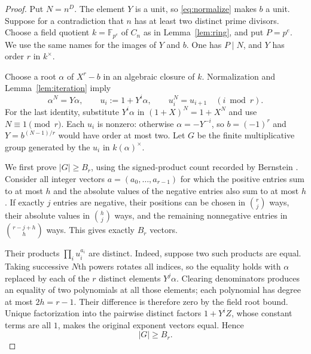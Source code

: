 \documentclass[11pt]{article}
\theoremstyle{definition}
\theoremstyle{remark}
\newcommand{\F}{\mathbb F}
\begin{document}
\begin{proof}
Put $N=n^D$. The element $Y$ is a unit, so
\eqref{eq:normalize} makes $b$ a unit. Suppose for a contradiction
that $n$ has at least two distinct prime divisors. Choose a field
quotient $k=\F_{p^e}$ of $C_n$ as in Lemma~\ref{lem:ring}, and
put $P=p^e$. We use the same names for the images of $Y$ and $b$.
One has $P\mid N$, and $Y$ has order $r$ in $k^\times$.

Choose a root $\alpha$ of $X^r-b$ in an algebraic closure of $k$.
Normalization and Lemma~\ref{lem:iteration} imply
\[
 \alpha^N=Y\alpha,\qquad
 u_i:=1+Y^i\alpha,\qquad u_i^N=u_{i+1}\quad(i\bmod r).
\]
For the last identity, substitute $Y^i\alpha$ in
$(1+X)^N=1+X^N$ and use $N\equiv1\pmod r$.
Each $u_i$ is nonzero: otherwise $\alpha=-Y^{-i}$, so
$b=(-1)^r$ and $Y=b^{(N-1)/r}$ would have order at most two.
Let $G$ be the finite multiplicative group generated by the $u_i$
in $k(\alpha)^\times$.

We first prove $|G|\ge B_r$, using the signed-product count recorded
by Bernstein \cite[Section 3]{bernstein}. Consider all integer vectors
$a=(a_0,\ldots,a_{r-1})$ for which the positive entries sum to at
most $h$ and the absolute values of the negative entries also sum
to at most $h$. If exactly $j$ entries are negative, their positions
can be chosen in $\binom rj$ ways, their absolute values in
$\binom hj$ ways, and the remaining nonnegative entries in
$\binom{r-j+h}{h}$ ways. This gives exactly $B_r$ vectors.

Their products $\prod_i u_i^{a_i}$ are distinct. Indeed, suppose
two such products are equal. Taking successive $N$th powers rotates
all indices, so the equality holds with $\alpha$ replaced by each
of the $r$ distinct elements $Y^j\alpha$. Clearing denominators
produces an equality of two polynomials at all those elements;
each polynomial has degree at most $2h=r-1$. Their difference is
therefore zero by the field root bound. Unique factorization into
the pairwise distinct factors $1+Y^i Z$, whose constant terms are
all $1$, makes the original exponent vectors equal. Hence
\begin{equation}\label{eq:lower-group}
 |G|\ge B_r.
\end{equation}


\end{proof}
\end{document}
